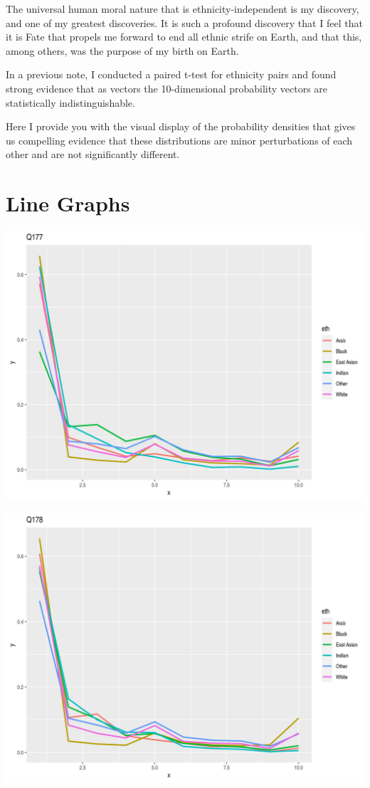 \documentclass{amsart}
\begin{document}
The universal human moral nature that is ethnicity-independent is my discovery, and one of my greatest discoveries.  It is such a profound discovery that I feel that it is Fate that propels me forward to end all ethnic strife on Earth, and that this, among others, was the purpose of my birth on Earth.  

In a previous note, I conducted a paired t-test for ethnicity pairs and found strong evidence that as vectors the 10-dimensional probability vectors are statistically indistinguishable.

Here I provide you with the visual display of the probability densities that gives us compelling evidence that these distributions are minor perturbations of each other and are not significantly different.


\section{Line Graphs}

\includegraphics[scale=0.7]{q177.jpeg}

\includegraphics[scale=0.7]{q178.jpeg}
\end{document}
